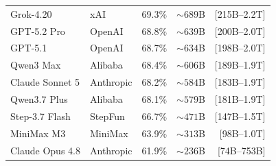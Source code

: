 \begin{tabular}{llrrr}
Grok-4.20 & xAI & 69.3\% & ${\sim}689$B & [215B--2.2T] \\
GPT-5.2 Pro & OpenAI & 68.8\% & ${\sim}639$B & [200B--2.0T] \\
GPT-5.1 & OpenAI & 68.7\% & ${\sim}634$B & [198B--2.0T] \\
Qwen3 Max & Alibaba & 68.4\% & ${\sim}606$B & [189B--1.9T] \\
Claude Sonnet 5 & Anthropic & 68.2\% & ${\sim}584$B & [183B--1.9T] \\
Qwen3.7 Plus & Alibaba & 68.1\% & ${\sim}579$B & [181B--1.9T] \\
Step-3.7 Flash & StepFun & 66.7\% & ${\sim}471$B & [147B--1.5T] \\
MiniMax M3 & MiniMax & 63.9\% & ${\sim}313$B & [98B--1.0T] \\
Claude Opus 4.8 & Anthropic & 61.9\% & ${\sim}236$B & [74B--753B] \\
\bottomrule
\end{tabular}

